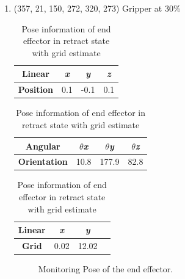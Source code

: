 \documentclass[12pt]{article}
\begin{document}
\begin{enumerate}
\begin{enumerate}
    \item (357, 21, 150, 272, 320, 273) Gripper at 30\%
    
    \begin{table}[H]
        \caption{Pose information of end effector in retract state with grid estimate}
        \begin{subtable}{.3\linewidth}
            \centering
            \begin{tabular}{cccc}
                \toprule
                \textbf{Linear} & \textit{x} & \textit{y} & \textit{z} \\\midrule
                \textbf{Position} & 0.1 & -0.1 & 0.1 \\\bottomrule
            \end{tabular}
        \end{subtable}
        \hfill
        \begin{subtable}{.4\linewidth}
            \centering
            \begin{tabular}{cccc}
                \toprule
                \textbf{Angular} & \textit{$\theta$x} & \textit{$\theta$y} & \textit{$\theta$z} \\\midrule
                \textbf{Orientation} & 10.8 & 177.9 & 82.8 \\\bottomrule
            \end{tabular}
        \end{subtable}
        \hfill
        \begin{subtable}{.25\linewidth}
            \centering
            \begin{tabular}{cccc}
                \toprule
                \textbf{Linear} & \textit{x} & \textit{y} \\\midrule
                \textbf{Grid} & 0.02 & 12.02 \\\bottomrule
            \end{tabular}
        \end{subtable}
    \end{table}

    \begin{figure}[]
        \centering
        \hfill
        \caption{Monitoring Pose of the end effector.}
        \label{fig:custom_arm}\vspace{-10pt}
    \end{figure}


\end{enumerate}
\end{enumerate}
\end{document}
